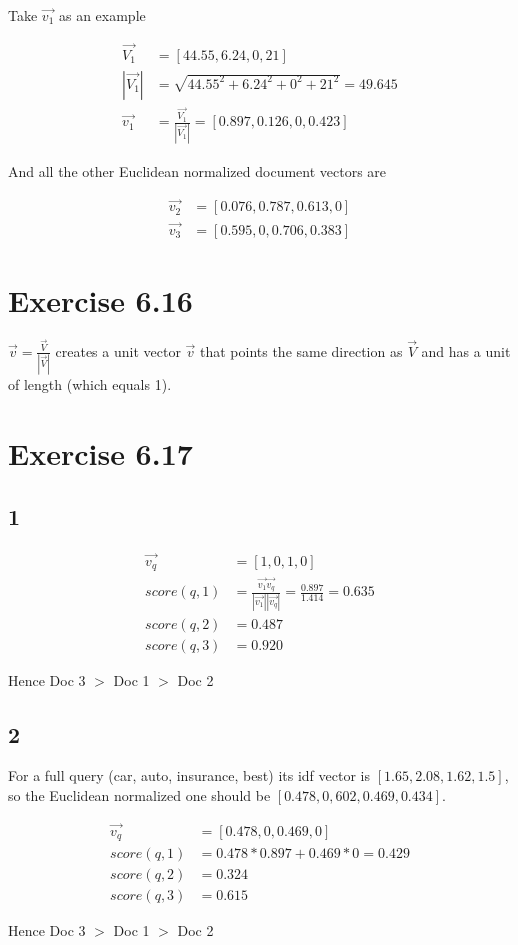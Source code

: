 \documentclass[11pt]{article} %
\begin{document}
Take $\vec{v_1}$ as an example

\begin{align*}
    \vec{V_1} &= [44.55, 6.24, 0, 21]\\
    |\vec{V_1}| &= \sqrt{44.55^2 + 6.24^2 + 0^2 + 21^2} = 49.645\\
    \vec{v_1} &= \frac{\vec{V_1}}{|\vec{V_1}|} = [0.897, 0.126, 0, 0.423]
\end{align*}

And all the other Euclidean normalized document vectors are

\begin{align*}
    \vec{v_2} &= [0.076, 0.787, 0.613, 0]\\
    \vec{v_3} &= [0.595, 0, 0.706, 0.383]
\end{align*}

\section*{Exercise 6.16}

$\vec{v} = \frac{\vec{V}}{|\vec{V}|}$ creates a unit vector $\vec{v}$ that points the same direction as $\vec{V}$ and has a unit of length (which equals 1).

\section*{Exercise 6.17}

\subsection*{1}

\begin{align*}
    \vec{v_q} &= [1, 0, 1, 0]\\
    score(q, 1) &= \frac{\vec{v_1}\vec{v_q}}{|\vec{v_1}||\vec{v_q}|} = \frac{0.897}{1.414} = 0.635\\
    score(q, 2) &= 0.487\\
    score(q, 3) &= 0.920
\end{align*}

Hence Doc 3 $>$ Doc 1 $>$ Doc 2

\subsection*{2}

For a full query (car, auto, insurance, best) its idf vector is $[1.65, 2.08, 1.62, 1.5]$, so the Euclidean normalized one should be $[0.478, 0,602, 0.469, 0.434]$.

\begin{align*}
    \vec{v_q} &= [0.478, 0, 0.469, 0]\\
    score(q, 1) &= 0.478 * 0.897 + 0.469 * 0 = 0.429\\
    score(q, 2) &= 0.324\\
    score(q, 3) &= 0.615
\end{align*}

Hence Doc 3 $>$ Doc 1 $>$ Doc 2
\end{document}
